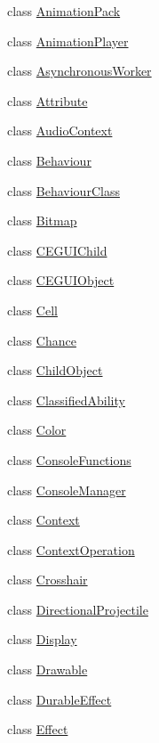 \begin{DoxyCompactItemize}
\item 
class \hyperlink{classZeta_1_1AnimationPack}{Animation\+Pack}
\item 
class \hyperlink{classZeta_1_1AnimationPlayer}{Animation\+Player}
\item 
class \hyperlink{classZeta_1_1AsynchronousWorker}{Asynchronous\+Worker}
\item 
class \hyperlink{classZeta_1_1Attribute}{Attribute}
\item 
class \hyperlink{classZeta_1_1AudioContext}{Audio\+Context}
\item 
class \hyperlink{classZeta_1_1Behaviour}{Behaviour}
\item 
class \hyperlink{classZeta_1_1BehaviourClass}{Behaviour\+Class}
\item 
class \hyperlink{classZeta_1_1Bitmap}{Bitmap}
\item 
class \hyperlink{classZeta_1_1CEGUIChild}{C\+E\+G\+U\+I\+Child}
\item 
class \hyperlink{classZeta_1_1CEGUIObject}{C\+E\+G\+U\+I\+Object}
\item 
class \hyperlink{classZeta_1_1Cell}{Cell}
\item 
class \hyperlink{classZeta_1_1Chance}{Chance}
\item 
class \hyperlink{classZeta_1_1ChildObject}{Child\+Object}
\item 
class \hyperlink{classZeta_1_1ClassifiedAbility}{Classified\+Ability}
\item 
class \hyperlink{classZeta_1_1Color}{Color}
\item 
class \hyperlink{classZeta_1_1ConsoleFunctions}{Console\+Functions}
\item 
class \hyperlink{classZeta_1_1ConsoleManager}{Console\+Manager}
\item 
class \hyperlink{classZeta_1_1Context}{Context}
\item 
class \hyperlink{classZeta_1_1ContextOperation}{Context\+Operation}
\item 
class \hyperlink{classZeta_1_1Crosshair}{Crosshair}
\item 
class \hyperlink{classZeta_1_1DirectionalProjectile}{Directional\+Projectile}
\item 
class \hyperlink{classZeta_1_1Display}{Display}
\item 
class \hyperlink{classZeta_1_1Drawable}{Drawable}
\item 
class \hyperlink{classZeta_1_1DurableEffect}{Durable\+Effect}
\item 
class \hyperlink{classZeta_1_1Effect}{Effect}

\end{DoxyCompactItemize}
